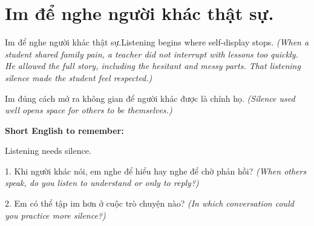 \section{Im để nghe người khác thật sự.}
\begin{truyen}{Im để nghe người khác thật sự.}{Listening begins where self-display stops.}
\textit{(When a student shared family pain, a teacher did not interrupt with lessons too quickly. He allowed the full story, including the hesitant and messy parts. That listening silence made the student feel respected.)}
\end{truyen}
\begin{baihoc}
Im đúng cách mở ra không gian để người khác được là chính họ.
\textit{(Silence used well opens space for others to be themselves.)}
\end{baihoc}
\begin{ghinhoanh}
\textbf{Short English to remember:}

Listening needs silence.
\end{ghinhoanh}
\begin{tuhocnhanh}
1. Khi người khác nói, em nghe để hiểu hay nghe để chờ phản hồi? \textit{(When others speak, do you listen to understand or only to reply?)}

2. Em có thể tập im hơn ở cuộc trò chuyện nào? \textit{(In which conversation could you practice more silence?)}
\end{tuhocnhanh}
\ngancach

